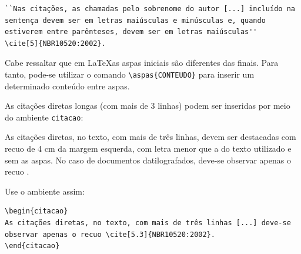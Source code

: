 \begin{verbatim}
``Nas citações, as chamadas pelo sobrenome do autor [...] incluído na 
sentença devem ser em letras maiúsculas e minúsculas e, quando 
estiverem entre parênteses, devem ser em letras maiúsculas''
\cite[5]{NBR10520:2002}.
\end{verbatim}

Cabe ressaltar que em \LaTeX as aspas iniciais são diferentes das finais. Para tanto, pode-se utilizar o comando \verb|\aspas{CONTEUDO}| para inserir um determinado conteúdo entre aspas.

As citações diretas longas (com mais de 3 linhas) podem ser inseridas por meio do ambiente \texttt{citacao}:

\begin{citacao}
As citações diretas, no texto, com mais de três linhas, devem ser
destacadas com recuo de 4 cm da margem esquerda, com letra menor que a do texto
utilizado e sem as aspas. No caso de documentos datilografados, deve-se
observar apenas o recuo \cite[5.3]{NBR10520:2002}.
\end{citacao}

Use o ambiente assim:

\begin{verbatim}
\begin{citacao}
As citações diretas, no texto, com mais de três linhas [...] deve-se 
observar apenas o recuo \cite[5.3]{NBR10520:2002}.
\end{citacao}
\end{verbatim}

